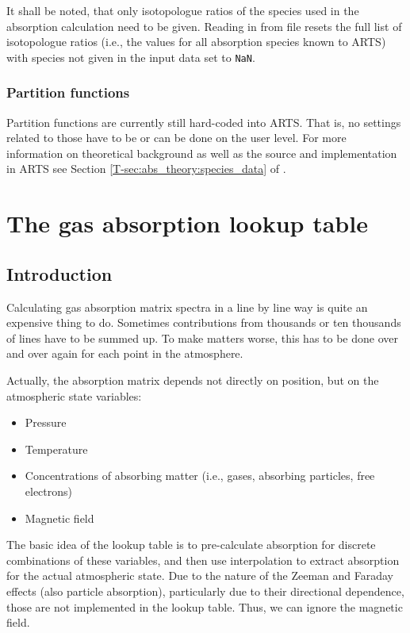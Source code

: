 It shall be noted, that only isotopologue ratios of the species used in the
absorption calculation need to be given. Reading in from file resets the full
list of isotopologue ratios (i.e., the values for all absorption species known to
ARTS) with species not given in the input data set to \verb|NaN|.

\subsubsection{Partition functions}
\label{sec:absorption:partition}

Partition functions are currently still hard-coded into ARTS. That is, no
settings related to those have to be or can be done on the user level. For more
information on theoretical background as well as the source and implementation
in ARTS see Section \ref{T-sec:abs_theory:species_data} of \theory.


\section{The gas absorption lookup table}
\label{sec:absorption:lookup}

\subsection{Introduction}

Calculating gas absorption matrix spectra in a line by line way
is quite an expensive thing to do. Sometimes contributions from
thousands or ten thousands of lines have to be summed up. To make
matters worse, this has to be done over and over again for each point
in the atmosphere.

Actually, the absorption matrix depends not directly on position,
but on the atmospheric state variables:
\begin{itemize}
\item Pressure
\item Temperature
\item Concentrations of absorbing matter (i.e., gases, absorbing particles, free
electrons)
\item Magnetic field
\end{itemize}

The basic idea of the lookup table is to pre-calculate absorption for
discrete combinations of these variables, and then use interpolation
to extract absorption for the actual atmospheric state. Due to the nature of
the Zeeman and Faraday effects (also particle absorption), particularly due to
their directional dependence, those are not implemented in the lookup table.
Thus, we can ignore the magnetic field.

